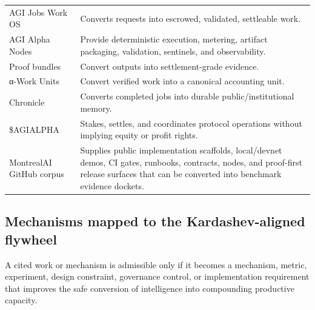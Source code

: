 \documentclass[
  11pt,
]{article}
\begin{document}
\begin{longtable}[]{@{}
  >{\raggedright\arraybackslash}p{}
  >{\raggedright\arraybackslash}p{}@{}}
AGI Jobs Work OS & Converts requests into escrowed, validated,
settleable work. \\
AGI Alpha Nodes & Provide deterministic execution, metering, artifact
packaging, validation, sentinels, and observability. \\
Proof bundles & Convert outputs into settlement-grade evidence. \\
α-Work Units & Convert verified work into a canonical accounting
unit. \\
Chronicle & Converts completed jobs into durable public/institutional
memory. \\
\$AGIALPHA & Stakes, settles, and coordinates protocol operations
without implying equity or profit rights. \\
MontrealAI GitHub corpus & Supplies public implementation scaffolds,
local/devnet demos, CI gates, runbooks, contracts, nodes, and
proof-first release surfaces that can be converted into benchmark
evidence dockets. \\
\end{longtable}

\subsection{Mechanisms mapped to the Kardashev-aligned
flywheel}\label{mechanisms-mapped-to-the-kardashev-aligned-flywheel}

A cited work or mechanism is admissible only if it becomes a mechanism,
metric, experiment, design constraint, governance control, or
implementation requirement that improves the safe conversion of
intelligence into compounding productive capacity.
\end{document}

